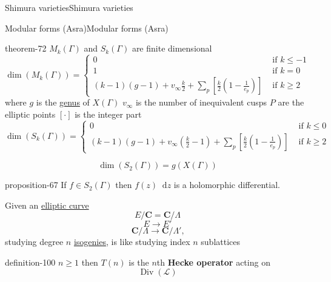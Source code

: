 \documentclass[10pt,]{book}
\newcommand{\terminology}[1]{\textbf{#1}}
\numberwithin{equation}{section}
\newcommand{\diff}{\mathop{}\!\mathrm{d}}
\newcommand{\lb}{[}
\newcommand{\rb}{]}
\newcommand{\CC}{\mathbf{C}}
\DeclareMathOperator{\divisors}{Div}
\newcommand{\amp}{&}
\begin{document}
\begin{chapterptx}{Shimura varieties}{}{Shimura varieties}{}{}
\begin{sectionptx}{Modular forms (Asra)}{}{Modular forms (Asra)}{}{}
\begin{theorem}{}{}{theorem-72}%
\hypertarget{p-1068}{}%
\(M_k(\Gamma)\) and \(S_k(\Gamma)\) are finite dimensional%
\begin{equation*}
\dim(M_k(\Gamma)) =
\begin{cases}
0 \amp \text{ if } k \le -1\\
1 \amp \text{ if } k = 0\\
(k-1)(g-1) + v_\infty \frac k2 + \sum_p [\frac k2 (1- \frac{1}{e_p})] \amp \text{ if } k \ge 2
\end{cases}
\end{equation*}
where \(g\) is the \hyperref[def-class-set]{genus} of \(X(\Gamma)\) \(v_\infty\) is the number of inequivalent cusps \(P\) are the elliptic points \(\lb \cdot \rb\) is the integer part%
\begin{equation*}
\dim(S_k(\Gamma)) =
\begin{cases}
0 \amp \text{ if } k \le 0 \\
(k-1)(g-1) + v_\infty (\frac k2 - 1) + \sum_p [\frac k2 (1- \frac{1}{e_p})] \amp \text{ if } k \ge 2
\end{cases}
\end{equation*}
%
\end{theorem}
\hypertarget{p-1069}{}%
%
\begin{equation*}
\dim(S_2(\Gamma)) = g(X(\Gamma))
\end{equation*}
%
\begin{proposition}{}{}{proposition-67}%
\hypertarget{p-1070}{}%
If \(f \in S_2(\Gamma)\) then \(f(z) \diff z\) is a holomorphic differential.%
\end{proposition}
\hypertarget{p-1071}{}%
Given an \hyperref[def-supersing-isog-ec]{elliptic curve}%
\begin{equation*}
E/  \CC = \CC/\Lambda
\end{equation*}
%
\begin{equation*}
E \to E'
\end{equation*}
%
\begin{equation*}
\CC/\Lambda \to \CC/\Lambda'\text{,}
\end{equation*}
studying degree \(n\) \hyperref[def-supersing-isog-isog]{isogenies}, is like studying index  \(n \) sublattices%
\begin{definition}{}{definition-100}%
\hypertarget{p-1072}{}%
\(n \ge 1\) then \(T(n)\) is the  \(n\)th \terminology{Hecke operator} acting on%
\begin{equation*}
\divisors (\mathcal L)
\end{equation*}

\end{definition}
\end{sectionptx}
\end{chapterptx}
\end{document}
